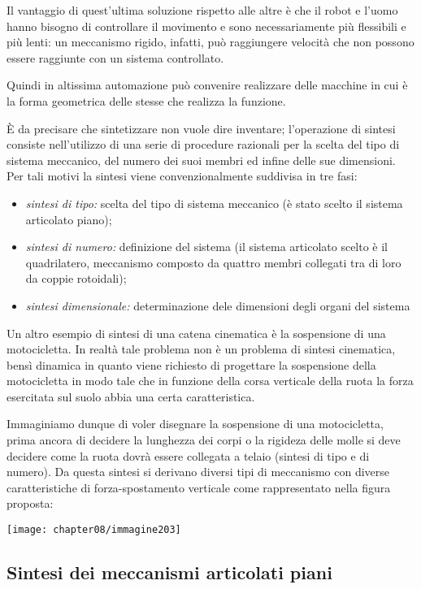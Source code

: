 Il vantaggio di quest'ultima soluzione rispetto alle altre è che il robot e l'uomo hanno bisogno di controllare il movimento e sono necessariamente più flessibili e più lenti: un meccanismo rigido, infatti, può raggiungere velocità che non possono essere raggiunte con un sistema controllato.

Quindi in altissima automazione può convenire realizzare delle macchine in cui è la forma geometrica delle stesse che realizza la funzione.
 
 È da precisare che sintetizzare non vuole dire inventare; l'operazione di sintesi consiste nell'utilizzo di una serie di procedure razionali per la scelta del tipo di sistema meccanico, del numero dei suoi membri ed infine delle sue dimensioni. Per tali motivi la sintesi viene convenzionalmente suddivisa in tre fasi:
 \begin{itemize}
 \item \emph{sintesi di tipo:} scelta del tipo di sistema meccanico (è stato scelto il sistema articolato piano);
 \item \emph{sintesi di numero:} definizione del sistema (il sistema articolato scelto è il quadrilatero, meccanismo composto da quattro membri collegati tra di loro da coppie rotoidali);
 \item \emph{sintesi dimensionale:} determinazione dele dimensioni degli organi del sistema
 \end{itemize}
 
 Un altro esempio di sintesi di una catena cinematica è la sospensione di una motocicletta. In realtà tale problema non è un problema di sintesi cinematica, bensì dinamica in quanto viene richiesto di progettare la sospensione della  motocicletta in modo tale che in funzione della corsa verticale della ruota la forza esercitata sul suolo abbia una certa caratteristica.
 
 Immaginiamo dunque di voler disegnare la sospensione di una motocicletta, prima ancora di decidere la lunghezza dei corpi o la rigideza delle molle si deve decidere come la ruota dovrà essere collegata a telaio (sintesi di tipo e di numero). Da questa sintesi si derivano diversi tipi di meccanismo con diverse caratteristiche di forza-spostamento verticale come rappresentato nella figura proposta:
 \begin{center}
 \texttt{[image: chapter08/immagine203]}
 \end{center}
 
\subsection{Sintesi dei meccanismi articolati piani}


